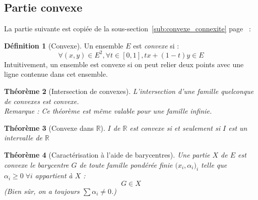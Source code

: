 \documentclass[11pt,a4paper]{report}
\newtheorem{theorem}{Théorème}[chapter]
\newtheorem{itheorem}[theorem]{Théorème}
\theoremstyle{definition}
\newtheorem{dfn}[theorem]{Définition}
\begin{document}
\subsection{Partie convexe} %
\label{sub:partie_convexe}
La partie suivante est copiée de la sous-section~\ref{sub:convexe_connexite} page~\pageref{sub:convexe_connexite} : 
\begin{dfn}[Convexe]
    \begin{minipage}{0.6\textwidth}
        Un ensemble $E$ est \emph{convexe} si : 
    \begin{equation}
    \forall (x,y) \in E^2, \forall t \in [0,1], \boxed{tx + (1-t)y \in E}
    \end{equation}
    Intuitivement, un ensemble est convexe si on peut relier deux points avec une ligne contenue dans cet ensemble.
    \end{minipage}\hspace{5mm}
    \begin{minipage}{0.3\textwidth}
    \end{minipage}
\end{dfn}
\begin{theorem}[Intersection de convexes]
     L'intersection d'une famille quelconque de convexes est convexe.\\[\baselineskip]
     \emph{Remarque :} Ce théorème est même valable pour une famille infinie.
\end{theorem}
\begin{theorem}[Convexe dans \ensuremath{\mathbb{R}}]
    $I$ de $\ensuremath{\mathbb{R}}$ est convexe \emph{si et seulement si} $I$ est un intervalle de $\ensuremath{\mathbb{R}}$
\end{theorem}
\begin{itheorem}[Caractérisation à l'aide de barycentres]
     Une partie $X$ de $E$ est convexe \Longleftrightarrow le barycentre $G$ de toute famille pondérée finie $\big( x_i,\alpha_i \big)_i$ telle que $\alpha_i \ge 0\; \forall i$ appartient à $X$ : 
     \begin{equation}
     G \in X
     \end{equation}
     (Bien sûr, on a toujours $\sum \alpha_i \neq 0$.)
\end{itheorem}
\end{document}

